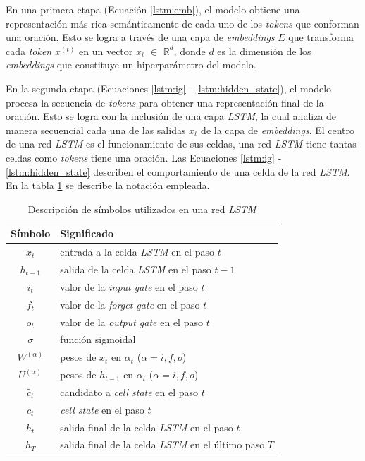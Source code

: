 En una primera etapa (Ecuación \ref{lstm:emb}), el modelo obtiene una representación más rica semánticamente de cada uno de los \textit{tokens} que conforman una oración. Esto se logra a través de una capa de \textit{embeddings} $E$ que transforma cada \textit{token} $x^{(t)}$ en un vector $x_{t}$ $\in$ ${\mathbb{R}} ^{d}$, donde $d$ es la dimensión de los \textit{embeddings} que constituye un hiperparámetro del modelo.

En la segunda etapa (Ecuaciones \ref{lstm:ig} - \ref{lstm:hidden_state}), el modelo procesa la secuencia de \textit{tokens} para obtener una representación final de la oración. Esto se logra con la inclusión de una capa \textit{LSTM}, la cual analiza de manera secuencial cada una de las salidas $x_{t}$ de la capa de \textit{embeddings}. El centro de una red \textit{LSTM} es el funcionamiento de sus celdas, una red \textit{LSTM} tiene tantas celdas como \textit{tokens} tiene una oración. Las Ecuaciones \ref{lstm:ig} - \ref{lstm:hidden_state} describen el comportamiento de una celda de la red \textit{LSTM}. En la tabla \ref{tab:cell_state} se describe la notación empleada.

\begin{table}[!tb]
  \center \caption{Descripción de símbolos utilizados en una red \textit{LSTM}}
    \begin{center}
      \begin{tabular}{|c|l|}
        \hline
        \textbf{Símbolo} & \textbf{Significado}\\
        \hline
        $x_{t}$ & entrada a la celda \textit{LSTM} en el paso $t$ \\
        $h_{t-1}$ & salida de la celda \textit{LSTM} en el paso $t-1$ \\
        $i_{t}$ & valor de la \textit{input gate} en el paso $t$\\
        $f_{t}$	& valor de la \textit{forget gate} en el paso $t$ \\
        $o_{t}$	& valor de la \textit{output gate} en el paso $t$\\
        $\sigma$ & función sigmoidal\\
        $W^{(\alpha)}$ & pesos de $x_{t}$ en $\alpha_t$ ($\alpha = {i, f, o}$) \\
        $U^{(\alpha)}$ & pesos de $h_{t-1}$ en $\alpha_t$ ($\alpha = {i, f, o}$) \\
        $\tilde{c_{t}}$ & candidato a \textit{cell state} en el paso $t$\\
        $c_{t}$ & \textit{cell state} en el paso $t$ \\
        $h_{t}$ & salida final de la celda \textit{LSTM} en el paso $t$ \\
        $h_{T}$ & salida final de la celda \textit{LSTM} en el último paso $T$ \\
        \hline
        \end{tabular}
    \end{center}
    \label{tab:cell_state}
\end{table}

